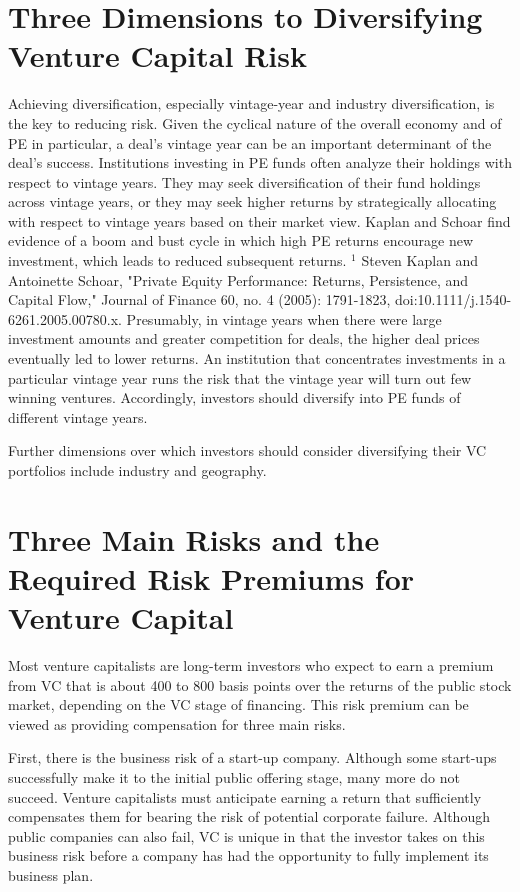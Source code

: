 \documentclass[11pt]{article}
\begin{document}
\section*{Three Dimensions to Diversifying Venture Capital Risk}
Achieving diversification, especially vintage-year and industry diversification, is the key to reducing risk. Given the cyclical nature of the overall economy and of PE in particular, a deal's vintage year can be an important determinant of the deal's success. Institutions investing in PE funds often analyze their holdings with respect to vintage years. They may seek diversification of their fund holdings across vintage years, or they may seek higher returns by strategically allocating with respect to vintage years based on their market view. Kaplan and Schoar find evidence of a boom and bust cycle in which high PE returns encourage new investment, which leads to reduced subsequent returns. ${ }^{1}$ Steven Kaplan and Antoinette Schoar, "Private Equity Performance: Returns, Persistence, and Capital Flow," Journal of Finance 60, no. 4 (2005): 1791-1823, doi:10.1111/j.1540-6261.2005.00780.x. Presumably, in vintage years when there were large investment amounts and greater competition for deals, the higher deal prices eventually led to lower returns. An institution that concentrates investments in a particular vintage year runs the risk that the vintage year will turn out few winning ventures. Accordingly, investors should diversify into PE funds of different vintage years.

Further dimensions over which investors should consider diversifying their VC portfolios include industry and geography.

\section*{Three Main Risks and the Required Risk Premiums for Venture Capital}
Most venture capitalists are long-term investors who expect to earn a premium from VC that is about 400 to 800 basis points over the returns of the public stock market, depending on the VC stage of financing. This risk premium can be viewed as providing compensation for three main risks.

First, there is the business risk of a start-up company. Although some start-ups successfully make it to the initial public offering stage, many more do not succeed. Venture capitalists must anticipate earning a return that sufficiently compensates them for bearing the risk of potential corporate failure. Although public companies can also fail, VC is unique in that the investor takes on this business risk before a company has had the opportunity to fully implement its business plan.
\end{document}
